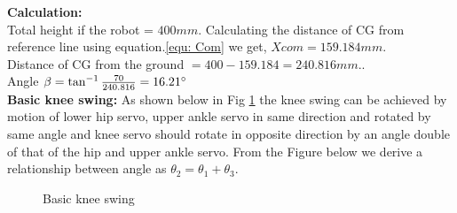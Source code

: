 \documentclass[12pt]{article}
\begin{document}
\newline
\textbf{Calculation:} \\
Total height if the robot = $400 mm $.
Calculating the distance of CG from reference line using equation.\eqref{equ: Com} we get, \newline
$Xcom =159.184 mm $.\\
Distance of CG from the ground $= 400-159.184= 240.816 mm.$.\\
Angle $\beta = \tan^{-1} \frac{70}{240.816} =16.21 \degree $\\

\textbf{Basic knee swing:} As shown below in Fig \ref{fig:p3motion} the knee swing can be achieved by motion
of lower hip servo, upper ankle servo in same direction and rotated by same angle and
knee servo should rotate in opposite direction by an angle double of that of the hip and
upper ankle servo. From the Figure below we derive a relationship between angle as $\theta_{2} =
\theta_{1} + \theta_{3}$.
\begin{figure}[h!]
	
	\centering
	\hspace{2cm}
	\newline
	
	\caption{Basic knee swing}
	\label{fig:p3motion}
\end{figure}
\end{document}
